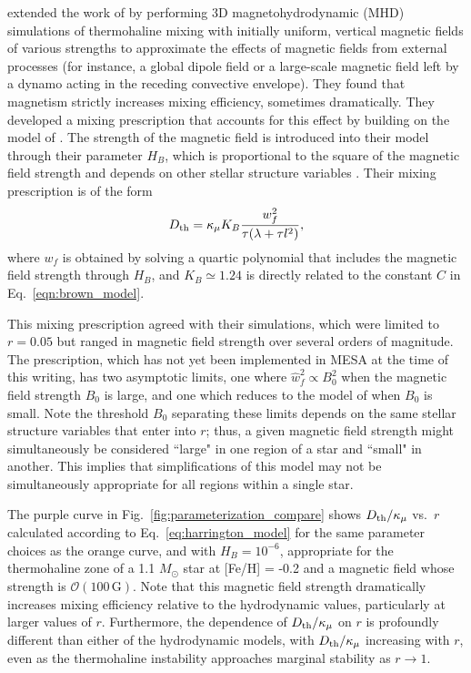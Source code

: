 \citet{harrington} extended the work of \citet{brown_etal_2013} by performing 3D magnetohydrodynamic (MHD) simulations of thermohaline mixing with initially uniform, vertical magnetic fields of various strengths to approximate the effects of magnetic fields from external processes (for instance, a global dipole field or a large-scale magnetic field left by a dynamo acting in the receding convective envelope). 
They found that magnetism strictly increases mixing efficiency, sometimes dramatically.
They developed a mixing prescription that accounts for this effect by building on the model of \citet{brown_etal_2013}.
The strength of the magnetic field is introduced into their model through their parameter $H_B$, which is proportional to the square of the magnetic field strength and depends on other stellar structure variables \citep[see Eq.~19 of][]{harrington}.
Their mixing prescription is of the form
\begin{equation} \label{eq:harrington_model}
    \Dth = \kappa_{\mu}K_B\frac{w_f^2}{\tau (\lambda + \tau l^2)},
\end{equation}
where $w_f$ is obtained by solving a quartic polynomial that includes the magnetic field strength through $H_B$, and $K_B \simeq 1.24$ is directly related to the constant $C$ in Eq.~\eqref{eqn:brown_model}.

This mixing prescription agreed with their simulations, which were limited to $r = 0.05$ but ranged in magnetic field strength over several orders of magnitude.
The prescription, which has not yet been implemented in MESA at the time of this writing, has two asymptotic limits, one where $\hat{w}_f^2 \propto B_0^2$ when the magnetic field strength $B_0$ is large, and one which reduces to the model of \citet{brown_etal_2013} when $B_0$ is small. 
Note the threshold $B_0$ separating these limits depends on the same stellar structure variables that enter into $r$; thus, a given magnetic field strength might simultaneously be considered ``large" in one region of a star and ``small" in another. 
This implies that simplifications of this model may not be simultaneously appropriate for all regions within a single star.

The purple curve in Fig.~\ref{fig:parameterization_compare} shows $D_\mathrm{th}/\kappa_\mu$ vs.~$r$ calculated according to Eq.~\eqref{eq:harrington_model} for the same parameter choices as the orange curve, and with $H_B = 10^{-6}$, appropriate for the thermohaline zone of a 1.1 $M_\odot$ star at [Fe/H] = -0.2 and a magnetic field whose strength is $\mathcal{O}(100 \,\mathrm{G})$. 
Note that this magnetic field strength dramatically increases mixing efficiency relative to the hydrodynamic values, particularly at larger values of $r$. 
Furthermore, the dependence of $D_\mathrm{th}/\kappa_\mu$ on $r$ is profoundly different than either of the hydrodynamic models, with $D_\mathrm{th}/\kappa_\mu$ increasing with $r$, even as the thermohaline instability approaches marginal stability as $r \to 1$.

